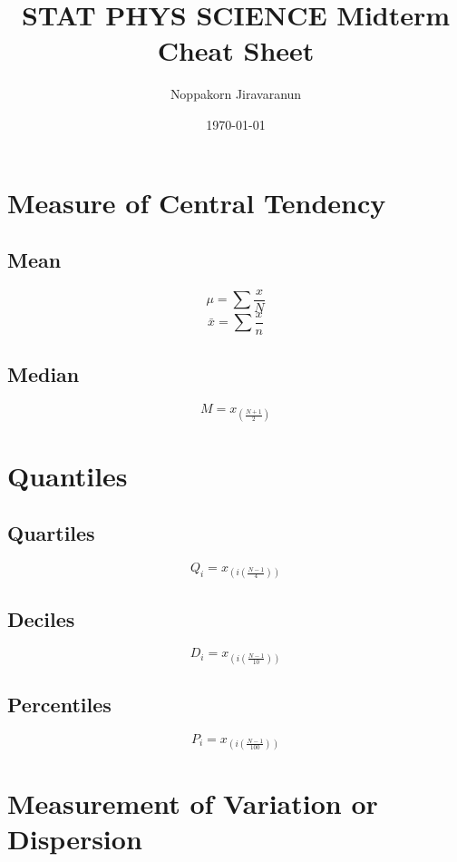 \documentclass{article}
\title{STAT PHYS SCIENCE Midterm Cheat Sheet}
\author{Noppakorn Jiravaranun}
\date{\today}
\begin{document}
    \maketitle
    \section{Measure of Central Tendency}
    \subsection{Mean}
    \begin{equation}
        \mu = \sum\frac{x}{N}
    \end{equation}
    \begin{equation}
        \bar{x} = \sum\frac{x}{n}
    \end{equation}
    \subsection{Median}
    \begin{equation}
        M = x_{(\frac{N+1}{2})}
    \end{equation}
    \section{Quantiles}
    \subsection{Quartiles}
    \begin{equation}
        Q_{i} = x_{(i(\frac{N-1}{4}))}
    \end{equation}
    \subsection{Deciles}
    \begin{equation}
        D_{i} = x_{(i(\frac{N-1}{10}))}
    \end{equation}
    \subsection{Percentiles}
    \begin{equation}
        P_{i} = x_{(i(\frac{N-1}{100}))}
    \end{equation}
    \newpage
    \section{Measurement of Variation or Dispersion}
\end{document}
